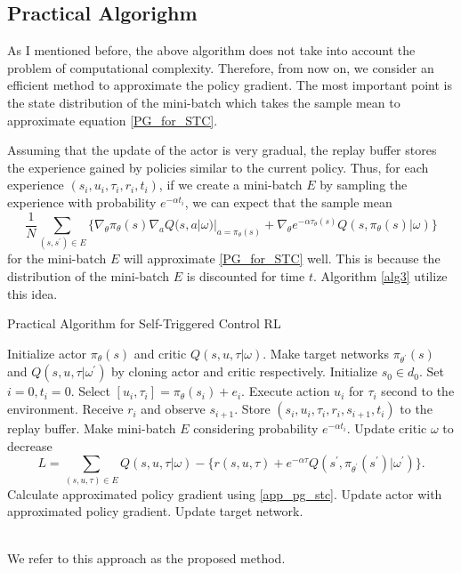 \documentclass[english, dvipdfmx]{ampmt}             %
\begin{document}
\subsection{Practical Algorighm}
As I mentioned before, the above algorithm does not take into account the problem of computational complexity. Therefore, from now on, we consider an efficient method to approximate the policy gradient. The most important point is the state distribution of the mini-batch which takes the sample mean to approximate equation \eqref{PG_for_STC}. \par
Assuming that the update of the actor is very gradual, the replay buffer stores the experience gained by policies similar to the current policy. Thus, for each experience $(s_i, u_i, \tau_i, r_i, t_i)$, if we create a mini-batch $E$ by sampling the experience with probability $e^{-\alpha t_i}$, we can expect that the sample mean
\begin{equation}
	\frac{1}{N}\sum_{(s, s^{\prime})\in E}\{\nabla_{\theta}\pi_{\theta}(s)\nabla_{a}Q(s,a|\omega)|_{a=\pi_{\theta}(s)}+\nabla_{\theta}e^{-\alpha\tau_{\theta}(s)}Q(s, \pi_{\theta}(s)|\omega)\} \label{app_pg_stc}
\end{equation}
for the mini-batch $E$ will approximate \eqref{PG_for_STC} well. This is because the distribution of the mini-batch $E$ is discounted for time $t$. Algorithm \ref{alg3} utilize this idea.
\begin{algorithm}                      
\caption{Practical Algorithm for Self-Triggered Control RL}         
\label{alg3}                          
\begin{algorithmic}                  
    \STATE Initialize actor $\pi_{\theta}(s)$ and critic $Q(s,u,\tau|\omega)$.
    \STATE Make target networks $\pi_{\theta^{\prime}}(s)$ and $Q(s,u,\tau|\omega^{\prime})$ by cloning actor and critic respectively.
    	\STATE Initialize $s_0\in d_0$.
    	\STATE Set $i = 0, t_i = 0$.
    		\STATE Select $[u_i, \tau_i] = \pi_{\theta}(s_i) + e_i$.
		\STATE Execute action $u_i$ for $\tau_i$ second to the environment.
		\STATE Receive $r_i$ and observe $s_{i+1}$.
		\STATE Store $(s_i, u_i, \tau_i, r_i, s_{i+1}, t_i)$ to the replay buffer.
		\STATE Make mini-batch $E$ considering probability $e^{-\alpha t_i}$.
		\STATE Update critic $\omega$ to decrease 
			\[L = \sum_{(s,u,\tau)\in E}Q(s,u,\tau|\omega) - \{r(s,u,\tau) + e^{-\alpha\tau}Q(s^{\prime}, \pi_{\theta^{\prime}}(s^{\prime})|\omega^{\prime})\}.\] %
		\STATE Calculate approximated policy gradient using \eqref{app_pg_stc}.
		\STATE Update actor with approximated policy gradient.
		\STATE Update target network.
    	\ENDWHILE
    \ENDFOR
\end{algorithmic}
\end{algorithm}\\
We refer to this approach as the proposed method.
\end{document}
